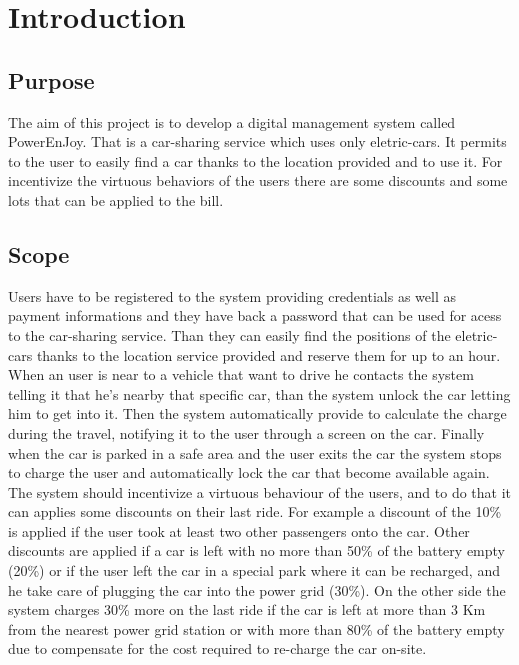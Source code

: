\documentclass[openright]{report}
\begin{document}
    \chapter{Introduction}
    \section{Purpose}
	The aim of this project is to develop a digital management system called PowerEnJoy. That is a car-sharing service which uses only eletric-cars. It permits to the user to easily find a car thanks to the location provided and to use it. For incentivize the virtuous behaviors of the users there are some discounts and some lots that can be applied to the bill.
	\section{Scope}
	Users have to be registered to the system providing credentials as well as payment informations and they have back a password that can be used for acess to the car-sharing service. Than they can easily find the positions of the eletric-cars thanks to the location service provided and reserve them for up to an hour. 
	\\When an user is near to a vehicle that want to drive he contacts the system telling it that he's nearby that specific car, than the system unlock the car letting him to get into it. Then the system automatically provide to calculate the charge during the travel, notifying it to the user through a screen on the car. Finally when the car is parked in a safe area and the user exits the car the system stops to charge the user and automatically lock the car that become available again.
	\\The system should incentivize a virtuous behaviour of the users, %
		and to do that it can applies some discounts on their last ride. For example a discount of the 10\% is applied if the user took at least two other passengers onto the car. Other discounts are applied if a car is left with no more than 50\% of the battery empty (20\%) or if the user left the car in a special park where it can be recharged, and he take care of plugging the car into the power grid (30\%). On the other side the system charges 30\% more on the last ride if the car is left at more than 3 Km from the nearest power grid station or with more than 80\% of the battery empty due to compensate for the cost required to re-charge the car on-site.
    
\end{document}
